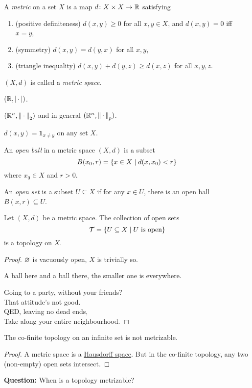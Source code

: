 \begin{definition*}[Metric] \label{def:metric}
    A \emph{metric} on a set $X$ is a map $d\colon X \times X \to \mathbb{R}$
    satisfying
    \begin{enumerate}[label=\small(M\arabic*)]
        \item (positive definiteness) $d(x, y) \ge 0$ for all $x, y \in X$,
            and $d(x, y) = 0$ iff $x = y$,
        \item (symmetry) $d(x, y) = d(y, x)$ for all $x, y$,
        \item (triangle inequality)
            $d(x, y) + d(y, z) \ge d(x, z)$ for all $x, y, z$.
    \end{enumerate}
    $(X, d)$ is called a \emph{metric space}.
\end{definition*}
\begin{examples}
    \item $(\mathbb{R}, \lvert\,\cdot\,\rvert)$.
    \item $(\mathbb{R}^n, {\lVert\,\cdot\,\rVert}_2)$ and in general
        $(\mathbb{R}^n, {\lVert\,\cdot\,\rVert}_p)$.
    \item $d(x, y) = \bm{1}_{x \ne y}$ on any set $X$.
\end{examples}

\begin{definition} \label{def:metric:open}
    An \emph{open ball} in a metric space $(X, d)$ is a subset \[
        B(x_0, r) = \{x \in X \mid d(x, x_0) < r\}
    \] where $x_0 \in X$ and $r > 0$.

    An \emph{open set} is a subset $U \subseteq X$ if for any $x \in U$,
    there is an open ball $B(x, r) \subseteq U$.
\end{definition}

\begin{theorem} \label{thm:topo:metric}
    Let $(X, d)$ be a metric space.
    The collection of open sets \[
        \mathcal{T} = \{U \subseteq X \mid \text{$U$ is open}\}
    \] is a topology on $X$.
\end{theorem}
\begin{proof}
    $\varnothing$ is vacuously open, $X$ is trivially so.

    A ball here and a ball there, the smaller one is everywhere.

    Going to a party, without your friends? \\
    That attitude's not good. \\
    QED, leaving no dead ends, \\
    Take along your entire neighbourhood.
\end{proof}

\begin{theorem*}
    The co-finite topology on an infinite set is not metrizable.
\end{theorem*}
\begin{proof}
    A metric space is a \href{https://en.wikipedia.org/wiki/Hausdorff_space}
    {Hausdorff space}.
    But in the co-finite topology, any two (non-empty) open sets intersect.
\end{proof}

\textbf{Question:} When is a topology metrizable?
